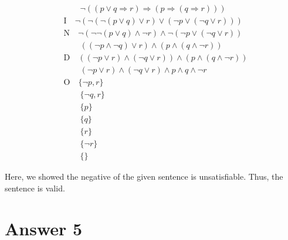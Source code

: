 \documentclass[12pt]{article}
\begin{document}

\begin{align*}
    & \hspace{2em} \neg ((p \vee q \Rightarrow r) \Rightarrow (p \Rightarrow (q \Rightarrow r))) \\
    & \text{I} \hspace{1em} \neg (\neg (\neg (p \vee q) \vee r) \vee (\neg p \vee (\neg q \vee r))) \\
    & \text{N} \hspace{1em} \neg (\neg \neg (p \vee q) \wedge \neg r) \wedge \neg (\neg p \vee (\neg q \vee r)) \\
    & \hspace{2em} ((\neg p \wedge \neg q) \vee r) \wedge (p \wedge (q \wedge \neg r)) \\
    & \text{D} \hspace{1em} ((\neg p \vee r) \wedge (\neg q \vee r)) \wedge (p \wedge (q \wedge \neg r)) \\
    & \hspace{2em} (\neg p \vee r) \wedge (\neg q \vee r) \wedge p \wedge q \wedge \neg r \\
    & \text{O} \hspace{1em} \{\neg p, r\} \\
    & \hspace{2em} \{\neg q, r\} \\
    & \hspace{2em} \{p\} \\
    & \hspace{2em} \{q\} \\
    & \hspace{2em} \{r\} \\
    & \hspace{2em} \{\neg r\} \\
    & \hspace{2em} \{\}
\end{align*}

Here, we showed the negative of the given sentence is unsatisfiable. Thus, the sentence is valid.

\newpage

\section*{Answer 5}
\end{document}
